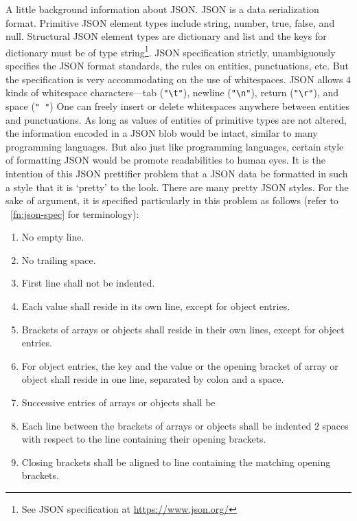 \documentclass[oneside,11pt]{book}
\makeatletter
\let\LaTeXAtSign=\@
\let\@=\relax
\let\@=\LaTeXAtSign
\theoremstyle{definition}
\theoremstyle{remark}
\newcommand{\code}[1]{\mbox{\lstinline{#1}}}
\makeatother
\begin{document}
A little background information about JSON\@.
JSON is a data serialization format.
Primitive JSON element types include string, number, true, false, and null.
Structural JSON element types are dictionary and list and the keys for dictionary
must be of type string\footnote{\label{fn:json-spec}See JSON specification
at \url{https://www.json.org/}}.
JSON specification strictly, unambiguously specifies the JSON format standards, the rules on
entities, punctuations, etc.
But the specification is very accommodating on the use of whitespaces.
JSON allows $4$ kinds of whitespace characters---tab (\code{"\t"}), newline (\code{"\n"}),
return (\code{"\r"}), and space (\code{" "})
One can freely insert or delete whitespaces anywhere between entities and punctuations.
As long as values of entities of primitive types are not altered, the information encoded in a
JSON blob would be intact, similar to many programming languages.
But also just like programming languages,
certain style of formatting JSON would be promote readabilities to human eyes.
It is the intention of this JSON prettifier problem that a JSON data be formatted in such a style
that it is `pretty' to the look.
There are many pretty JSON styles.
For the sake of argument, it is specified particularly in this problem as follows
(refer to ~\autoref{fn:json-spec} for terminology):
\begin{enumerate}
    \label{json-style-spec}
    \item No empty line.
    \item No trailing space.
    \item First line shall not be indented.
    \item Each value shall reside in its own line, except for object entries.
    \item Brackets of arrays or objects shall reside in their own lines, except for object entries.
    \item For object entries, the key and the value or the opening bracket of array or object
    shall reside in one line, separated by colon and a space.
    \item Successive entries of arrays or objects shall be
    \item Each line between the brackets of arrays or objects shall be indented $2$ spaces with
    respect to the line containing their opening brackets.
    \item Closing brackets shall be aligned to line containing the matching opening brackets.
\end{enumerate}
\end{document}
